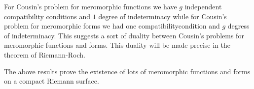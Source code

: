 For Cousin's problem for meromorphic functions we have $g$ independent
compatibility conditions and $1$ degree of indeterminacy while for
Cousin's problem for meromorphic forms we had one
compatibility\pageoriginale condition and $g$ degress of
indeterminacy. This suggests a sort of duality between Cousin's
problems for meromorphic functions and forms. This duality will be
made precise in the theorem of Riemann-Roch.

The above results prove the existence of lots of meromorphic functions
and forms on a compact Riemann surface.


